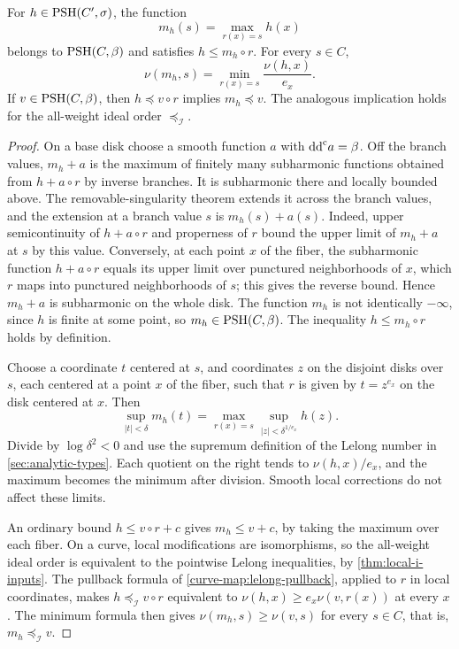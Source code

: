 \begin{lemma}\label{finite-curve:fiber-maximum}
For $h\in\mathrm{PSH}(C',\sigma)$, the function
\[
 m_h(s)=\max_{r(x)=s}h(x)
\]
belongs to $\mathrm{PSH}(C,\beta)$ and satisfies $h\leq m_h\circ r$.
For every $s\in C$,
\[
 \nu(m_h,s)=\min_{r(x)=s}\frac{\nu(h,x)}{e_x}.
\]
If $v\in\mathrm{PSH}(C,\beta)$, then $h\preceq v\circ r$ implies
$m_h\preceq v$. The analogous implication holds for the
all-weight ideal order $\preceq_{\mathcal I}$.
\end{lemma}
\begin{proof}
On a base disk choose a smooth function $a$ with $\mathrm{dd}^{\mathrm{c}} a=\beta$.
Off the branch values, $m_h+a$ is the maximum of finitely many
subharmonic functions obtained from $h+a\circ r$ by inverse
branches. It is subharmonic there and locally bounded above.
The removable-singularity theorem extends it across the branch
values, and the extension at a branch value $s$ is
$m_h(s)+a(s)$. Indeed, upper semicontinuity of $h+a\circ r$ and
properness of $r$ bound the upper limit of $m_h+a$ at $s$ by
this value. Conversely, at each point $x$ of the fiber, the
subharmonic function $h+a\circ r$ equals its upper limit over
punctured neighborhoods of $x$, which $r$ maps into punctured
neighborhoods of $s$; this gives the reverse bound. Hence
$m_h+a$ is subharmonic on the whole disk. The function $m_h$ is
not identically $-\infty$, since $h$ is finite at some point,
so $m_h\in\mathrm{PSH}(C,\beta)$. The inequality $h\leq m_h\circ r$
holds by definition.

Choose a coordinate $t$ centered at $s$, and coordinates $z$
on the disjoint disks over $s$, each centered at a point $x$ of
the fiber, such that $r$ is given by $t=z^{e_x}$ on the disk
centered at $x$. Then
\[
 \sup_{|t|<\delta}m_h(t)
 =\max_{r(x)=s}\sup_{|z|<\delta^{1/e_x}}h(z).
\]
Divide by $\log\delta^2<0$ and use the supremum definition
of the Lelong number in \cref{sec:analytic-types}. Each
quotient on the right tends to
$\nu(h,x)/e_x$, and the maximum becomes the minimum after
division. Smooth local corrections do not affect these limits.

An ordinary bound $h\leq v\circ r+c$ gives
$m_h\leq v+c$, by taking the maximum over each fiber. On a
curve, local modifications are isomorphisms, so the all-weight
ideal order is equivalent to the pointwise Lelong inequalities,
by \cref{thm:local-i-inputs}. The pullback formula of
\cref{curve-map:lelong-pullback}, applied to $r$ in local
coordinates, makes $h\preceq_{\mathcal I}v\circ r$ equivalent to
$\nu(h,x)\geq e_x\nu(v,r(x))$ at every $x$.
The minimum formula then gives $\nu(m_h,s)\geq\nu(v,s)$ for
every $s\in C$, that is, $m_h\preceq_{\mathcal I}v$.
\end{proof}

